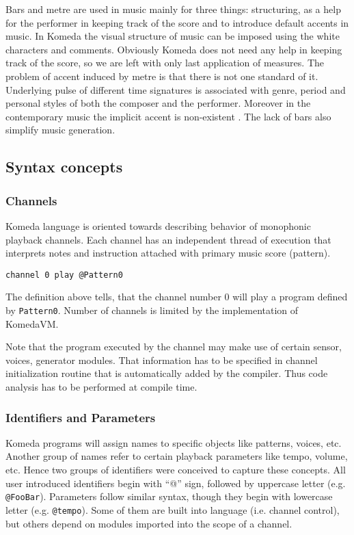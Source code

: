 \documentclass{article}
\begin{document}
Bars and metre are used in music mainly for three things: structuring, as a
help for the performer in keeping track of the score and to introduce default
accents in music. In Komeda the visual structure of music can be imposed using
the white characters and comments. Obviously Komeda does not need any help in
keeping track of the score, so we are left with only last application of
measures. The problem of accent induced by metre is that there is not one
standard of it. Underlying pulse of different time signatures is associated
with genre, period and personal styles of both the composer and the performer.
Moreover in the contemporary music the implicit accent is non-existent
\cite{harm}. The lack of bars also simplify music generation.

\subsection{Syntax concepts}
\label{lang:concepts}

\subsubsection{Channels}
Komeda language is oriented towards describing behavior of monophonic playback
channels. Each channel has an independent thread of execution that interprets
notes and instruction attached with primary music score (pattern).

\begin{lstlisting}[caption=Channel notation example]
channel 0 play @Pattern0
\end{lstlisting}

The definition above tells, that the channel number 0 will play a program
defined by {\tt Pattern0}. Number of channels is limited by the implementation
of KomedaVM.

Note that the program executed by the channel may make use of certain sensor,
voices, generator modules. That information has to be specified in channel
initialization routine that is automatically added by the compiler. Thus code
analysis has to be performed at compile time. 

\subsubsection{Identifiers and Parameters}

Komeda programs will assign names to specific objects like patterns, voices,
etc. Another group of names refer to certain playback parameters like tempo,
volume, etc. Hence two groups of identifiers were conceived to capture these
concepts. All user introduced identifiers begin with “@” sign, followed by
uppercase letter (e.g. {\tt @FooBar}). Parameters follow similar syntax, though
they begin with lowercase letter (e.g. {\tt @tempo}). Some of them are built
into language (i.e. channel control), but others depend on modules imported
into the scope of a channel.
\end{document}
